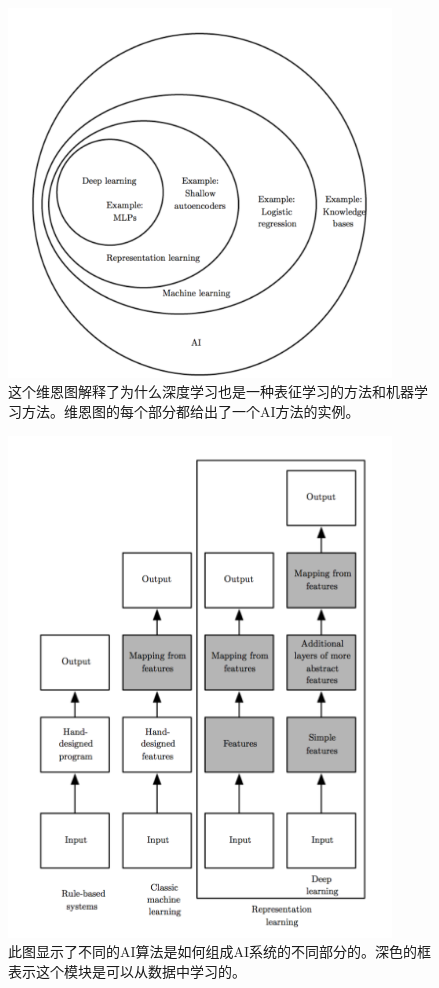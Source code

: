 \documentclass[a4paper,11pt]{book}
\begin{document}
\begin{figure}[htbp] %
   \centering
   \includegraphics[width=4in]{fig/chap1/ai_approach.png} 
   \caption{这个维恩图解释了为什么深度学习也是一种表征学习的方法和机器学习方法。维恩图的每个部分都给出了一个AI方法的实例。}
   \label{fig:ai_approach}
\end{figure}

\begin{figure}[htbp] %
   \centering
   \includegraphics[width=4in]{fig/chap1/ai_discipline.png} 
   \caption{此图显示了不同的AI算法是如何组成AI系统的不同部分的。深色的框表示这个模块是可以从数据中学习的。}
   \label{fig:ai_discipline}
\end{figure}
\end{document}
